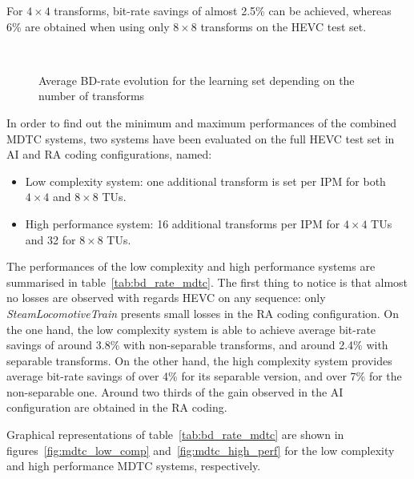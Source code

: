 \documentclass[11pt,a4paper,openright,twoside]{book}
\numberwithin{equation}{section} %
\numberwithin{figure}{section} %
\numberwithin{table}{section} %
\begin{document}
For $4\times4$ transforms, bit-rate savings of almost 2.5\% can be achieved,
whereas 6\% are obtained when using only $8\times8$ transforms on the
\ac{HEVC} test set.

\begin{figure}[tb]
	\centering
	\\
	\caption[\acs{BD}-rate for different separable and non-separable
	transform sets]
	{Average \acs{BD}-rate evolution for the learning set depending
	on the number of transforms}
	\label{fig:mdtc_bdrate_ntransforms}
\end{figure}

In order to find out the minimum and maximum performances of the combined
\ac{MDTC} systems, two systems have been evaluated on the full \ac{HEVC} test
set in \ac{AI} and \ac{RA} coding configurations, named:
\begin{itemize}
	\item Low complexity system: one additional transform is set per \ac{IPM}
		for both $4\times4$ and $8\times8$ \acp{TU}.
	\item High performance system: 16 additional transforms per \ac{IPM} for
		$4\times4$ \acp{TU} and 32 for $8\times8$ \acp{TU}.
\end{itemize}
The performances of the low complexity and high performance systems are
summarised in table~\ref{tab:bd_rate_mdtc}.
The first thing to notice is that almost no losses are observed with regards
\ac{HEVC} on any sequence: only \emph{SteamLocomotiveTrain} presents small
losses in the \ac{RA} coding configuration.
On the one hand, the low complexity system is able to achieve average bit-rate
savings of around 3.8\% with non-separable transforms, and around 2.4\% with
separable transforms.
On the other hand, the high complexity system provides average bit-rate
savings of over 4\% for its separable version, and over 7\% for the
non-separable one.
Around two thirds of the gain observed in the \ac{AI} configuration are
obtained in the \ac{RA} coding.

Graphical representations of table~\ref{tab:bd_rate_mdtc} are shown in
figures~\ref{fig:mdtc_low_comp} and~\ref{fig:mdtc_high_perf} for the
low complexity and high performance \ac{MDTC} systems, respectively.
\end{document}
